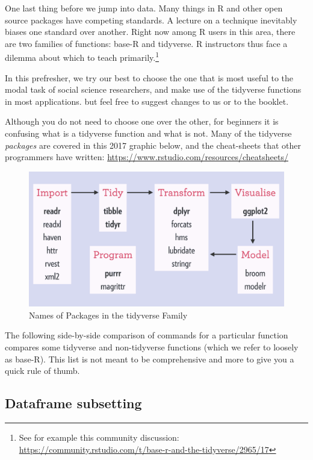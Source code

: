 \documentclass[]{book}
\let\rmarkdownfootnote\footnote%
\def\footnote{\protect\rmarkdownfootnote}
\theoremstyle{definition}
\theoremstyle{definition}
\theoremstyle{definition}
\theoremstyle{remark}
\begin{document}
One last thing before we jump into data. Many things in R and other open
source packages have competing standards. A lecture on a technique
inevitably biases one standard over another. Right now among R users in
this area, there are two families of functions: base-R and tidyverse. R
instructors thus face a dilemma about which to teach
primarily.\footnote{See for example this community discussion:
  \url{https://community.rstudio.com/t/base-r-and-the-tidyverse/2965/17}}

In this prefresher, we try our best to choose the one that is most
useful to the modal task of social science researchers, and make use of
the tidyverse functions in most applications. but feel free to suggest
changes to us or to the booklet.

Although you do not need to choose one over the other, for beginners it
is confusing what is a tidyverse function and what is not. Many of the
tidyverse \emph{packages} are covered in this 2017 graphic below, and
the cheat-sheets that other programmers have written:
\url{https://www.rstudio.com/resources/cheatsheets/}

\begin{figure}
\centering
\includegraphics{images/tidyverse-packages.png}
\caption{Names of Packages in the tidyverse Family}
\end{figure}

The following side-by-side comparison of commands for a particular
function compares some tidyverse and non-tidyverse functions (which we
refer to loosely as base-R). This list is not meant to be comprehensive
and more to give you a quick rule of thumb.

\subsection*{Dataframe subsetting}\label{dataframe-subsetting}
\end{document}
